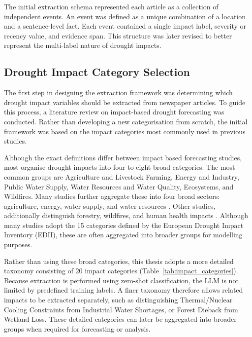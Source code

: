 The initial extraction schema represented each article as a collection of independent events. An event was defined as a unique combination of a location and a sentence-level fact. Each event contained a single impact label, severity or recency value, and evidence span. This structure was later revised to better represent the multi-label nature of drought impacts.



\subsection{Drought Impact Category Selection}

The first step in designing the extraction framework was determining which drought impact variables should be extracted from newspaper articles. To guide this process, a literature review on impact-based drought forecasting was conducted. Rather than developing a new categorisation from scratch, the initial framework was based on the impact categories most commonly used in previous studies.

Although the exact definitions differ between impact based forecasting studies, most organise drought impacts into four to eight broad categories. The most common groups are Agriculture and Livestock Farming, Energy and Industry, Public Water Supply, Water Resources and Water Quality, Ecosystems, and Wildfires. Many studies further aggregate these into four broad sectors: agriculture, energy, water supply, and water resources \cite{Stagge2015Modeling, lopez2025, Bulut2026Framework}. Other studies, additionally distinguish forestry, wildfires, and human health impacts \cite{Sutanto2019Moving, sodoge2023}. Although many studies adopt the 15 categories defined by the European Drought Impact Inventory (EDII), these are often aggregated into broader groups for modelling purposes.

Rather than using these broad categories, this thesis adopts a more detailed taxonomy consisting of 20 impact categories (Table~\ref{tab:impact_categories}). Because extraction is performed using zero-shot classification, the LLM is not limited by predefined training labels. A finer taxonomy therefore allows related impacts to be extracted separately, such as distinguishing Thermal/Nuclear Cooling Constraints from Industrial Water Shortages, or Forest Dieback from Wetland Loss. These detailed categories can later be aggregated into broader groups when required for forecasting or analysis.


